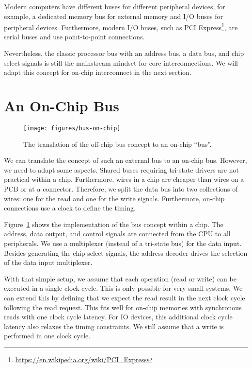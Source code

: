 \documentclass[%
    10pt,
    headinclude, footexclude,
    openright, %
    notitlepage,
    cleardoubleempty,
    headsepline,
    pointlessnumbers,
    bibtotoc, idxtotoc,
    ]{scrbook}
\newcommand{\scale}{0.7}
\newcommand{\myref}[2]{\href{#1}{#2}}
\renewcommand{\myref}[2]{{#2}{\footnote{\url{#1}}}}
\begin{document}
Modern computers have different buses for different peripheral devices, for example, a dedicated memory
bus for external memory and I/O buses for peripheral devices.
Furthermore, modern I/O buses, such as \myref{https://en.wikipedia.org/wiki/PCI_Express}{PCI Express},
are serial buses and use point-to-point connections.

Nevertheless, the classic processor bus with an address bus, a data bus, and chip select signals
is still the mainstream mindset for core interconnections. We will adapt this concept for
on-chip interconnect in the next section.

\section{An On-Chip Bus}

\begin{figure}
  \centering
  \texttt{[image: figures/bus-on-chip]}
  \caption{The translation of the off-chip bus concept to an on-chip ``bus''.}
  \label{fig:bus-on-chip}
\end{figure}

We can translate the concept of such an external bus to an on-chip bus. However, we need to adapt some aspects.
Shared buses requiring tri-state drivers are not practical within a chip. Furthermore,
wires in a chip are cheaper than wires on a PCB or at a connector. Therefore, we split the data bus
into two collections of wires: one for the read and one for the write signals.
Furthermore, on-chip connections use a clock to define the timing.

Figure~\ref{fig:bus-on-chip} shows the implementation of the bus concept within a chip.
The address, data output, and control signals are connected from the CPU to all peripherals.
We use a multiplexer (instead of a tri-state bus) for the data input.
Besides generating the chip select signals, the address decoder drives the selection of
the data input multiplexer.

With that simple setup, we assume that each operation (read or write) can be executed in
a single clock cycle. This is only possible for very small systems. We can extend this by defining
that we expect the read result in the next clock cycle following the read request. This fits
well for on-chip memories with synchronous reads with one clock cycle latency.
For IO devices, this additional clock cycle latency also relaxes the timing constraints.
We still assume that a write is performed in one clock cycle.
\end{document}
